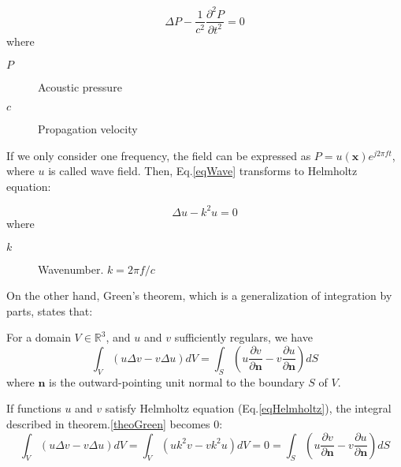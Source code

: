 \begin{equation}
\Delta P - \frac{1}{c^2}\frac{\partial^2 P}{\partial t^2} = 0
\label{eqWave}
\end{equation}
where
\begin{description}
	\item[$P$] Acoustic pressure
	\item[$c$] Propagation velocity
\end{description}

If we only consider one frequency, the field can be expressed as $P = u(\mathbf{x})e^{j 2\pi f t}$, where $u$ is called wave field. Then, Eq.\ref{eqWave} transforms to Helmholtz equation:

\begin{equation}
\Delta u - k^2 u = 0
\label{eqHelmholtz}
\end{equation}
where
\begin{description}
	\item[$k$] Wavenumber. $k = 2\pi f/c$
\end{description}

On the other hand, Green’s theorem, which is a generalization of integration by parts, states that:

\begin{theorem}
	\label{theoGreen}
	For a domain $V \in \mathbb{R}^3$, and $u$ and $v$ sufficiently regulars, we have
	\begin{equation}
	\int_{V} \left( u \Delta v - v \Delta u \right) dV = \int_{S} \left(u\frac{\partial v}{\partial \mathbf{n}} - v \frac{\partial u}{\partial \mathbf{n}}\right) dS
	\label{eqGreen}
	\end{equation}
	where $\mathbf{n}$ is the outward-pointing unit normal to the boundary $S$ of $V$.
\end{theorem}

If functions $u$ and $v$ satisfy Helmholtz equation (Eq.\ref{eqHelmholtz}), the integral described in theorem.\ref{theoGreen} becomes 0:
\begin{equation}
	\int_{V} \left( u \Delta v - v \Delta u \right) dV = \int_{V} \left(u k^2 v - v k^2 u \right) dV = 0 = \int_{S} \left(u\frac{\partial v}{\partial \mathbf{n}} - v \frac{\partial u}{\partial \mathbf{n}}\right) dS
	\label{eqWaveAndGreen}
\end{equation}

